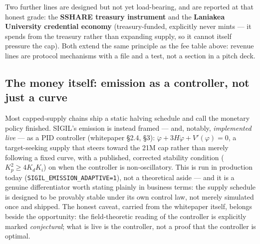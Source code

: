 Two further lines are designed but not yet load-bearing, and are reported at that honest grade: the \textbf{SSHARE treasury instrument} and the \textbf{Laniakea University credential economy} (treasury-funded, explicitly never mints --- it spends from the treasury rather than expanding supply, so it cannot itself pressure the cap). Both extend the same principle as the fee table above: revenue lines are protocol mechanisms with a file and a test, not a section in a pitch deck.

\subsection{The money itself: emission as a controller, not just a curve}

Most capped-supply chains ship a static halving schedule and call the monetary policy finished. SIGIL's emission is instead framed --- and, notably, \emph{implemented live} --- as a PID controller (whitepaper \S2.4, \S3): $\ddot\varphi + 3H\dot\varphi + V'(\varphi) = 0$, a target-seeking supply that steers toward the 21M cap rather than merely following a fixed curve, with a published, corrected stability condition ($K_p^2 \geq 4K_dK_i$) on when the controller is non-oscillatory. This is run in production today (\texttt{SIGIL\_EMISSION\_ADAPTIVE=1}), not a theoretical aside --- and it is a genuine differentiator worth stating plainly in business terms: the supply schedule is designed to be provably stable under its own control law, not merely simulated once and shipped. The honest caveat, carried from the whitepaper itself, belongs beside the opportunity: the field-theoretic reading of the controller is explicitly marked \emph{conjectural}; what is live is the controller, not a proof that the controller is optimal.

